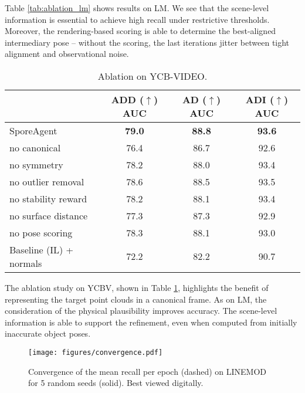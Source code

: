 \documentclass[10pt,twocolumn,letterpaper]{article}
\begin{document}
Table \ref{tab:ablation_lm} shows results on LM. We see that the scene-level information is essential to achieve high recall under restrictive thresholds. Moreover, the rendering-based scoring is able to determine the best-aligned intermediary pose -- without the scoring, the last iterations jitter between tight alignment and observational noise.

\begin{table}[]
\setlength\tabcolsep{1.0ex}
\footnotesize
    \centering
    \begin{tabular}{l|ccc}
                    & \makecell{ADD ($\uparrow$)\\AUC} & \makecell{AD ($\uparrow$)\\AUC} & \makecell{ADI ($\uparrow$)\\AUC}\\\hline
\rowcolor[rgb]{0.95,0.95,0.95}
SporeAgent           & \textbf{79.0} & \textbf{88.8} & \textbf{93.6} \\
no canonical         & 76.4 & 86.7 & 92.6 \\
no symmetry          & 78.2 & 88.0 & 93.4 \\
no outlier removal      & 78.6 & 88.5 & 93.5 \\ %
no stability reward  & 78.2 & 88.1 & 93.4 \\
no surface distance  & 77.3 & 87.3 & 92.9 \\
no pose scoring      & 78.3 & 88.1 & 93.0 \\ \hline
\rowcolor[rgb]{0.95,0.95,0.95}
Baseline (IL) + normals  & 72.2 & 82.2 & 90.7 \\
    \end{tabular}\vspace{1ex}
    \caption{Ablation on YCB-VIDEO.
    }
    \label{tab:ablation_ycbv}
\end{table}

The ablation study on YCBV, shown in Table \ref{tab:ablation_ycbv}, highlights the benefit of representing the target point clouds in a canonical frame. As on LM, the consideration of the physical plausibility improves accuracy. The scene-level information is able to support the refinement, even when computed from initially inaccurate object poses.

\begin{figure}
    \centering
    \texttt{[image: figures/convergence.pdf]}
    \caption{Convergence of the mean recall per epoch (dashed) on LINEMOD for 5 random seeds (solid). Best viewed digitally.}
    \label{fig:convergence}
\end{figure}
\end{document}
